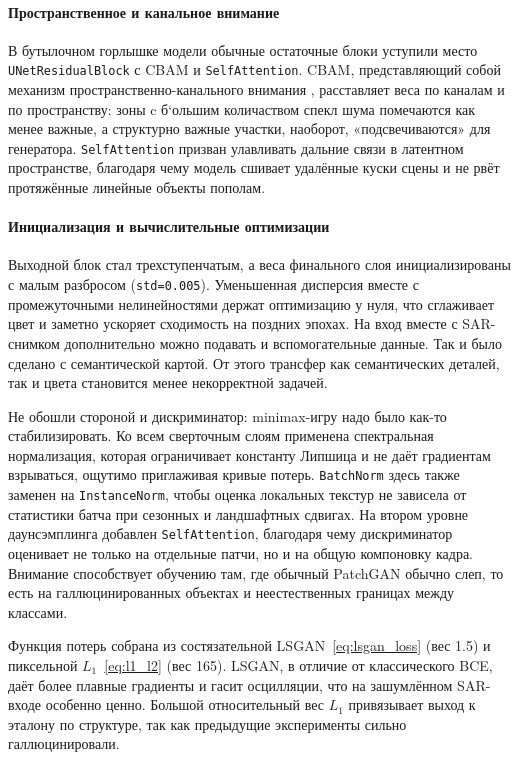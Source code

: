 \paragraph{Пространственное и канальное внимание}
В бутылочном горлышке модели обычные остаточные блоки уступили место \texttt{UNetResidualBlock} с CBAM и \texttt{SelfAttention}.
CBAM, представляющий собой механизм пространственно-канального внимания \cite{woo2018cbam}, расставляет веса по каналам и по пространству: зоны c б`ольшим количаством спекл шума помечаются как менее важные, а структурно важные участки, наоборот, «подсвечиваются» для генератора.
\texttt{SelfAttention} призван улавливать дальние связи в латентном пространстве, благодаря чему модель сшивает удалённые куски сцены и не рвёт протяжённые линейные объекты пополам.

\paragraph{Инициализация и вычислительные оптимизации}
Выходной блок стал трехступенчатым, а веса финального слоя инициализированы с малым разбросом (\texttt{std=0.005}).
Уменьшенная дисперсия вместе с промежуточными нелинейностями держат оптимизацию у нуля, что сглаживает цвет и заметно ускоряет сходимость на поздних эпохах.
На вход вместе с SAR-снимком дополнительно можно подавать и вспомогательные данные.
Так и было сделано с семантической картой.
От этого трансфер как семантических деталей, так и цвета становится менее некорректной задачей.

Не обошли стороной и дискриминатор: minimax-игру надо было как-то стабилизировать.
Ко всем сверточным слоям применена спектральная нормализация, которая ограничивает константу Липшица и не даёт градиентам взрываться, ощутимо приглаживая кривые потерь.
\texttt{BatchNorm} здесь также заменен на \texttt{InstanceNorm}, чтобы оценка локальных текстур не зависела от статистики батча при сезонных и ландшафтных сдвигах.
На втором уровне даунсэмплинга добавлен \texttt{SelfAttention}, благодаря чему дискриминатор оценивает не только на отдельные патчи, но и на общую компоновку кадра.
Внимание способствует обучению там, где обычный PatchGAN обычно слеп, то есть на галлюцинированных объектах и неестественных границах между классами.

Функция потерь собрана из состязательной LSGAN~\eqref{eq:lsgan_loss} (вес 1.5) и пиксельной $L_1$~\eqref{eq:l1_l2} (вес 165).
LSGAN, в отличие от классического BCE, даёт более плавные градиенты и гасит осцилляции, что на зашумлённом SAR-входе особенно ценно.
Большой относительный вес $L_1$ привязывает выход к эталону по структуре, так как предыдущие эксперименты сильно галлюцинировали.

